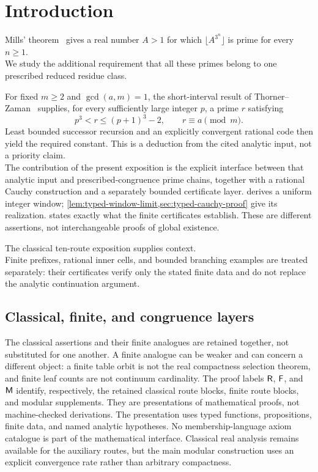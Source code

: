 \documentclass[11pt,reqno]{amsart}
\makeatletter
\theoremstyle{blueplain}
\newcounter{type}
\newcounter{asser}
\renewenvironment{quotation}
{\list{}{\listparindent\z@
		\itemindent\z@
		\rightmargin\leftmargin
		\parsep\z@}	\item\relax}
{\endlist}
\numberwithin{equation}{section}
\def\hyperlink#1#2{#2}}
\makeatother
\begin{document}
\section{Introduction}
\begin{quotation}
Mills' theorem~\cite{Mills1947} gives a real number \(A>1\) for which
\(\lfloor A^{3^n}\rfloor\) is prime for every \(n\ge1\).\\
We study the additional requirement that all these primes belong to
one prescribed reduced residue class.

For fixed \(m\ge2\) and \(\operatorname{\hyperlink{abbr:gcd}{gcd}}(a,m)=1\), the short-interval result of
Thorner--Zaman~\cite{ThornerZaman2024} supplies, for every sufficiently
large integer \(p\), a prime \(r\) satisfying
\[
p^3<r\le(p+1)^3-2,
\qquad r\equiv a\pmod m.
\]
Least bounded successor recursion and an explicitly convergent rational
code then yield the required constant. This is a deduction from the cited analytic input,
not a priority claim.\\

The contribution of the present exposition is the explicit interface between
that analytic input and prescribed-congruence prime chains, together with a
rational Cauchy construction and a separately bounded certificate layer.
 derives a uniform integer window;
\cref{lem:typed-window-limit,sec:typed-cauchy-proof} give its realization.
 states exactly what the finite certificates establish.
These are different assertions, not interchangeable proofs of global existence.

The classical ten-route exposition supplies context.\\
Finite prefixes, rational inner cells, and bounded branching examples
are treated separately: their certificates verify only the stated
finite data and do not replace the analytic continuation argument.

\end{quotation}

\subsection{Classical, finite, and congruence layers}\label{sec:merged-scope}
The classical assertions and their finite analogues are retained together,
not substituted for one another. A finite analogue can be weaker and can
concern a different object: a finite table orbit is not the real compactness
selection theorem, and finite leaf counts are not continuum cardinality.
The proof labels \(\textsf R\), \(\textsf F\), and \(\textsf M\) identify,
respectively, the retained classical route blocks, finite route blocks,
and modular supplements. They are presentations of mathematical proofs,
not machine-checked derivations. The presentation uses typed functions,
propositions, finite data, and named analytic hypotheses. No membership-language
axiom catalogue is part of the mathematical interface. Classical real analysis
remains available for the auxiliary routes, but the main modular construction
uses an explicit convergence rate rather than arbitrary compactness.
\end{document}
